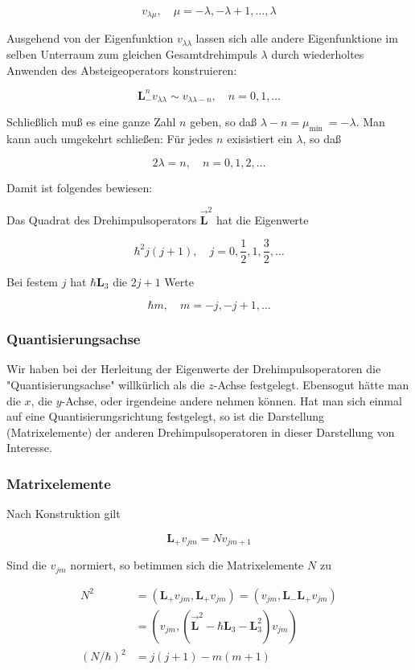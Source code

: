 \documentclass[10pt, letterpaper]{article}
\begin{document}
$$
v_{\lambda \mu}, \quad \mu=-\lambda,-\lambda+1, \ldots, \lambda
$$

Ausgehend von der Eigenfunktion $v_{\lambda \lambda}$ lassen sich alle andere Eigenfunktione im selben Unterraum zum gleichen Gesamtdrehimpuls $\lambda$ durch wiederholtes Anwenden des Absteigeoperators konstruieren:

$$
\mathbf{L}_{-}^{n} v_{\lambda \lambda} \sim v_{\lambda \lambda-n}, \quad n=0,1, \ldots
$$

Schließlich muß es eine ganze Zahl $n$ geben, so daß $\lambda-n=\mu_{\text {min }}=-\lambda$. Man kann auch umgekehrt schließen: Für jedes $n$ exisistiert ein $\lambda$, so daß

$$
2 \lambda=n, \quad n=0,1,2, \ldots
$$

Damit ist folgendes bewiesen:

Das Quadrat des Drehimpulsoperators $\overrightarrow{\mathbf{L}}^{2}$ hat die Eigenwerte

$$
\hbar^{2} j(j+1), \quad j=0, \frac{1}{2}, 1, \frac{3}{2}, \ldots
$$

Bei festem $j$ hat $\hbar \mathbf{L}_{3}$ die $2 j+1$ Werte

$$
\hbar m, \quad m=-j,-j+1, \ldots
$$

\subsubsection*{Quantisierungsachse}
Wir haben bei der Herleitung der Eigenwerte der Drehimpulsoperatoren die "Quantisierungsachse" willkürlich als die $z$-Achse festgelegt. Ebensogut hätte man die $x$, die $y$-Achse, oder irgendeine andere nehmen können. Hat man sich einmal auf eine Quantisierungsrichtung festgelegt, so ist die Darstellung (Matrixelemente) der anderen Drehimpulsoperatoren in dieser Darstellung von Interesse.

\subsubsection*{Matrixelemente}
Nach Konstruktion gilt

$$
\mathbf{L}_{+} v_{j m}=N v_{j m+1}
$$

Sind die $v_{j m}$ normiert, so betimmen sich die Matrixelemente $N$ zu

$$
\begin{aligned}
N^{2} & =\left(\mathbf{L}_{+} v_{j m}, \mathbf{L}_{+} v_{j m}\right)=\left(v_{j m}, \mathbf{L}_{-} \mathbf{L}_{+} v_{j m}\right) \\
& =\left(v_{j m},\left(\overrightarrow{\mathbf{L}}^{2}-\hbar \mathbf{L}_{3}-\mathbf{L}_{3}^{2}\right) v_{j m}\right) \\
(N / \hbar)^{2} & =j(j+1)-m(m+1)
\end{aligned}
$$
\end{document}
